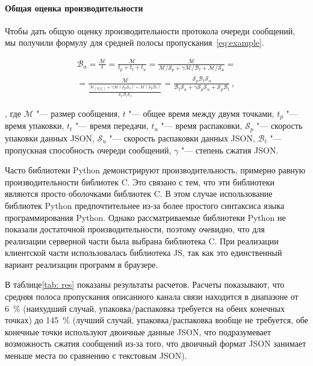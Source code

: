 \paragraph{Общая оценка производительности}

Чтобы дать общую оценку производительности протокола очереди сообщений, мы получили формулу для средней полосы пропускания~\cref{eq:example}.

\begin{equation}
\begin{split}
	\label{eq:example}
	\mathcal{B}_a = \frac{\mathcal{M}}{t}
	= \frac{\mathcal{M}}{t_p + t_t + t_u}
	= \frac{\mathcal{M}}
	{\mathcal{M} / \mathcal{S}_p + 
		\gamma\mathcal{M} / \mathcal{B}_t + 
		\mathcal{M} / \mathcal{S}_u} = \\
	= \frac{\mathcal{M}}
	{\frac{\mathcal{M}_(\mathcal{B}_t\mathcal{S}_u) +
			\gamma
			\mathcal{M}(\mathcal{S}_p\mathcal{S}_u) +
			\mathcal{M}(\mathcal{S}_p\mathcal{B}_t)} 
		{\mathcal{S}_p\mathcal{B}_t\mathcal{S}_u}
	}
	=\frac{\mathcal{S}_p\mathcal{B}_t\mathcal{S}_u}
	{\mathcal{B}_t\mathcal{S}_u + \gamma\mathcal{S}_p\mathcal{S}_u + \mathcal{S}_p\mathcal{B}_t}\,,
\end{split}
\end{equation}

\noindent, где ${\mathcal{M}}$ "--- размер сообщения, $t$ "--- общее время между двумя точками, $t_p$ "--- время упаковки, $t_t$ "--- время передачи, $t_u$ "--- время распаковки, $\mathcal{S}_p$ "--- скорость упаковки данных JSON, $\mathcal{S}_u$ "--- скорость распаковки данных JSON, $\mathcal{B}_t$ "--- пропускная способность очереди сообщений, $\gamma$ "--- степень сжатия JSON.

Часто библиотеки Python демонстрируют производительность, примерно равную производительности библиотек C. Это связано с тем, что эти библиотеки являются просто оболочками библиотек C. В этом случае использование библиотек Python предпочтительнее из-за более простого синтаксиса языка программирования Python. Однако рассматриваемые библиотеки Python не показали достаточной производительности, поэтому очевидно, что для реализации серверной части была выбрана библиотека C. При реализации клиентской части использовалась библиотека JS, так как это единственный вариант реализации программ в браузере.

В таблице\cref{tab: res} показаны результаты расчетов. Расчеты показывают, что средняя полоса пропускания описанного канала связи находится в диапазоне от \SI{6}{\percent} (наихудший случай, упаковка/распаковка требуется на обеих конечных точках) до \SI{145}{\percent} (лучший случай, упаковка/распаковка вообще не требуется, обе конечные точки используют двоичные данные JSON, что подразумевает возможность сжатия сообщений из-за того, что двоичный формат JSON занимает меньше места по сравнению с текстовым JSON).

